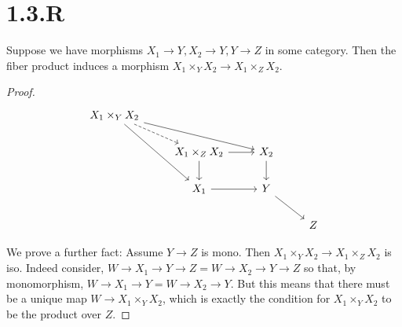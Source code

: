 \documentclass{article}
\begin{document}
\section{1.3.R}
\begin{theorem}
    Suppose we have morphisms $X_1 \to Y, X_2 \to Y, Y \to Z$ in some category. Then the
    fiber product induces a morphism $X_1 \times_Y X_2 \to X_1 \times_Z X_2$.
\end{theorem}
\begin{proof}
    \[
        \begin{tikzcd}
            {X_1\times_YX_2}                \\
             & {X_1\times_ZX_2} & {X_2}     \\
             & {X_1}            & Y         \\
             &                  &       & Z
            \arrow[from=3-2, to=3-3]
            \arrow[from=2-3, to=3-3]
            \arrow[from=3-3, to=4-4]
            \arrow[from=2-2, to=3-2]
            \arrow[from=2-2, to=2-3]
            \arrow[from=1-1, to=3-2]
            \arrow[from=1-1, to=2-3]
            \arrow[dashed, from=1-1, to=2-2]
        \end{tikzcd}
    \]

    We prove a further fact: Assume $Y \to Z$ is mono. Then
    $X_1\times_YX_2 \to X_1\times_ZX_2$ is iso. Indeed consider, $W \to X_1 \to Y \to Z = W \to X_2 \to Y \to Z$ so that,
    by monomorphism, $W \to X_1 \to Y = W \to X_2 \to Y$. But this means that there must be a
    unique map $W \to X_1 \times_Y X_2$, which is exactly the condition for
    $X_1 \times_Y X_2$ to be the product over $Z$.
\end{proof}
\end{document}
